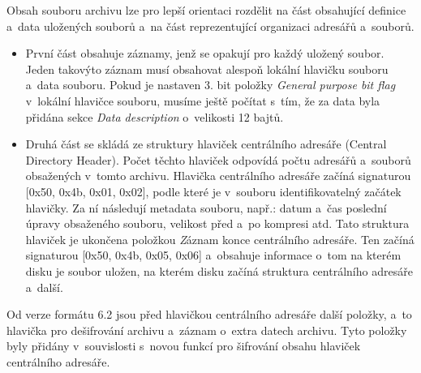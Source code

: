  Obsah souboru archivu lze pro lepší orientaci rozdělit na část obsahující definice a~data
uložených souborů a~na část reprezentující organizaci adresářů a~souborů.
\begin{itemize}
    \item První část obsahuje záznamy, jenž se opakují pro každý uložený soubor. Jeden takovýto
záznam musí obsahovat alespoň lokální hlavičku souboru a~data souboru. Pokud je nastaven
3. bit položky {\it General purpose bit flag} v~lokální hlavičce souboru, musíme ještě počítat
s~tím, že za data byla přidána sekce {\it Data description} o~velikosti 12 bajtů.
    \item Druhá část se skládá ze struktury hlaviček centrálního adresáře (Central Directory
	Header). Počet těchto hlaviček odpovídá počtu adresářů a~souborů obsažených v~tomto
	archivu. Hlavička centrálního adresáře začíná signaturou [0x50, 0x4b, 0x01, 0x02], podle které je
	v~souboru identifikovatelný začátek hlavičky. Za ní následují metadata souboru, např.: datum a~čas
	poslední úpravy obsaženého souboru, velikost před a~po kompresi atd. Tato struktura hlaviček je
	ukončena položkou {\textit Záznam konce centrálního adresáře}. Ten začíná signaturou [0x50, 0x4b, 0x05, 0x06]
	a~obsahuje informace o~tom na kterém disku je soubor uložen, na kterém disku začíná struktura
	centrálního adresáře a~další.
\end{itemize}
Od verze formátu 6.2 jsou před hlavičkou centrálního adresáře další položky, a~to hlavička
pro dešifrování archivu a~záznam o~extra datech archivu. Tyto položky byly přidány
v~souvislosti s~novou funkcí pro šifrování obsahu hlaviček centrálního adresáře.


